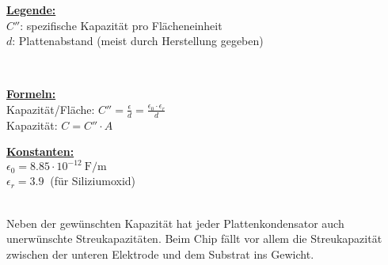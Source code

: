 \begin{minipage}[c]{0.45\textwidth}
	\uline{\textbf{Legende:}}\\
	$C''$: spezifische Kapazität pro Flächeneinheit\\
	$d$:   Plattenabstand (meist durch Herstellung gegeben)
\end{minipage}
\\[2ex]
\begin{minipage}[c]{0.55\textwidth}
	\uline{\textbf{Formeln:}}\\
	Kapazität/Fläche: $C'' = \frac{\epsilon}{d} = \frac{\epsilon_0 \cdot \epsilon_r}{d}$\\
	Kapazität: \hspace{11.5mm}$C = C'' \cdot A$
\end{minipage}
\begin{minipage}[c]{0.45\textwidth}
	\uline{\textbf{Konstanten:}}\\
	$\epsilon_0 = 8.85 \cdot 10^{-12} \SI{}{\farad / \meter}$\\
	$\epsilon_r = \SI{3.9}{}$ (für Siliziumoxid)
\end{minipage}
\\[2ex]
Neben der gewünschten Kapazität hat jeder Plattenkondensator auch unerwünschte Streukapazitäten. 
Beim Chip fällt vor allem die Streukapazität zwischen der unteren Elektrode und dem Substrat ins Gewicht.

